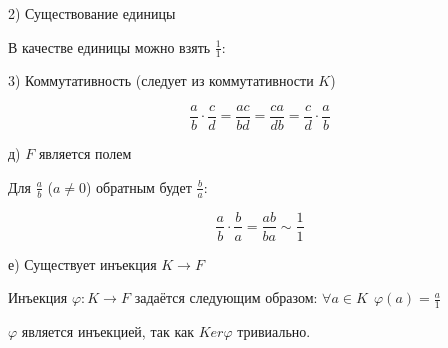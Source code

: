 2) Существование единицы

В качестве единицы можно взять $\frac{1}{1}$:

3) Коммутативность (следует из коммутативности $K$)

$$
\frac{a}{b} \cdot \frac{c}{d} = \frac{ac}{bd} = \frac{ca}{db} = 
\frac{c}{d} \cdot \frac{a}{b}
$$

д) $F$ является полем

Для $\frac{a}{b}$ ($a \neq 0$) обратным будет $\frac{b}{a}$:

$$
\frac{a}{b} \cdot \frac{b}{a} = \frac{ab}{ba} \sim \frac{1}{1}
$$

е) Существует инъекция $K \to F$

Инъекция $\varphi: K \to F$ задаётся следующим образом:
$\forall a \in K \ \ \varphi(a) = \frac{a}{1}$

$\varphi$ является инъекцией, так как $Ker \varphi$ тривиально.